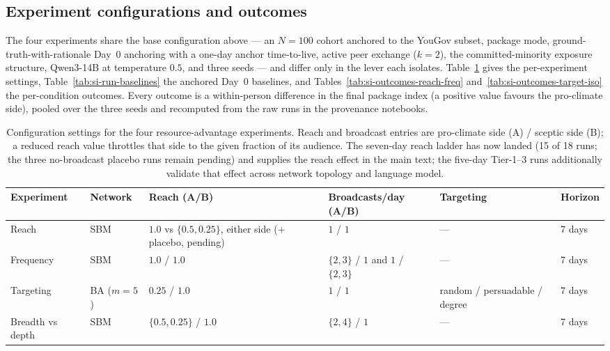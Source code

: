 \documentclass[pdflatex,sn-mathphys-num]{sn-jnl}%
\theoremstyle{thmstyleone}%
\theoremstyle{thmstyletwo}%
\theoremstyle{thmstylethree}%
\begin{document}
\subsection{Experiment configurations and outcomes}\label{subsec:si-reported-runs}

The four experiments share the base configuration above --- an $N=100$ cohort
anchored to the YouGov subset, package mode, ground-truth-with-rationale Day~0
anchoring with a one-day anchor time-to-live, active peer exchange ($k=2$), the
committed-minority exposure structure, Qwen3-14B at temperature $0.5$, and three
seeds --- and differ only in the lever each isolates.
Table~\ref{tab:si-run-config} gives the per-experiment settings,
Table~\ref{tab:si-run-baselines} the anchored Day~0 baselines, and
Tables~\ref{tab:si-outcomes-reach-freq} and~\ref{tab:si-outcomes-target-iso} the
per-condition outcomes. Every outcome is a within-person difference in the final
package index (a positive value favours the pro-climate side), pooled over the
three seeds and recomputed from the raw runs in the provenance notebooks.

\begin{table}[t]
  \centering
  \footnotesize
  \caption{Configuration settings for the four resource-advantage experiments.
  Reach and broadcast entries are pro-climate side (A) / sceptic side (B); a
  reduced reach value throttles that side to the given fraction of its audience.
  The seven-day reach ladder has now landed (15 of 18 runs; the three no-broadcast
  placebo runs remain pending) and supplies the reach effect in the main text; the
  five-day Tier-1--3 runs additionally validate that effect across network topology
  and language model.}
  \label{tab:si-run-config}
  \begin{tabular}{@{}llllll@{}}
    \toprule
    Experiment & Network & Reach (A/B) & Broadcasts/day (A/B) & Targeting & Horizon \\
    \midrule
    Reach & SBM & $1.0$ vs $\{0.5, 0.25\}$, either side ($+$ placebo, pending) & $1$ / $1$ & --- & 7 days \\
    Frequency & SBM & $1.0$ / $1.0$ & $\{2,3\}$ / $1$ and $1$ / $\{2,3\}$ & --- & 7 days \\
    Targeting & BA ($m=5$) & $0.25$ / $1.0$ & $1$ / $1$ & random / persuadable / degree & 7 days \\
    Breadth vs depth & SBM & $\{0.5, 0.25\}$ / $1.0$ & $\{2,4\}$ / $1$ & --- & 7 days \\
    \bottomrule
  \end{tabular}
\end{table}
\end{document}
